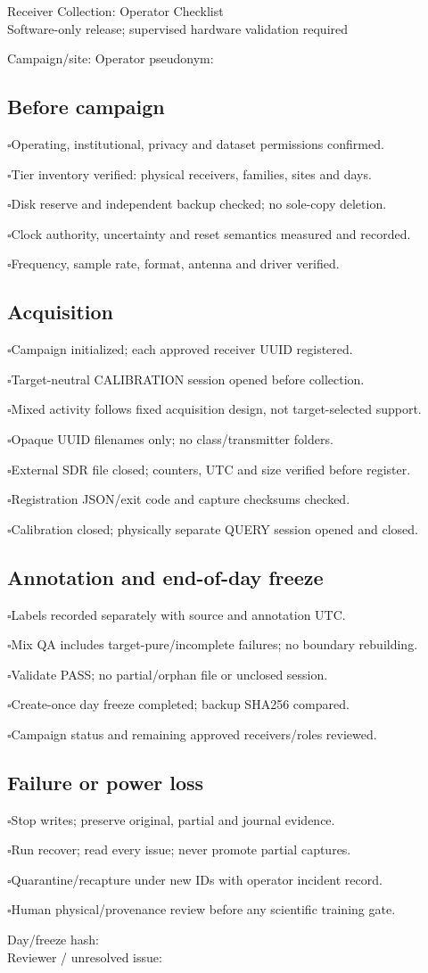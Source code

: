 \documentclass[10pt]{article}
\newcommand{\checkitem}[1]{\noindent$\square$\quad #1\par\smallskip}
\begin{document}
\begin{center}\Large Receiver Collection: Operator Checklist\\
\normalsize Software-only release; supervised hardware validation required\end{center}
\noindent Campaign/site: \hrulefill\quad Operator pseudonym: \hrulefill

\subsection*{Before campaign}
\checkitem{Operating, institutional, privacy and dataset permissions confirmed.}
\checkitem{Tier inventory verified: physical receivers, families, sites and days.}
\checkitem{Disk reserve and independent backup checked; no sole-copy deletion.}
\checkitem{Clock authority, uncertainty and reset semantics measured and recorded.}
\checkitem{Frequency, sample rate, format, antenna and driver verified.}

\subsection*{Acquisition}
\checkitem{Campaign initialized; each approved receiver UUID registered.}
\checkitem{Target-neutral CALIBRATION session opened before collection.}
\checkitem{Mixed activity follows fixed acquisition design, not target-selected support.}
\checkitem{Opaque UUID filenames only; no class/transmitter folders.}
\checkitem{External SDR file closed; counters, UTC and size verified before register.}
\checkitem{Registration JSON/exit code and capture checksums checked.}
\checkitem{Calibration closed; physically separate QUERY session opened and closed.}

\subsection*{Annotation and end-of-day freeze}
\checkitem{Labels recorded separately with source and annotation UTC.}
\checkitem{Mix QA includes target-pure/incomplete failures; no boundary rebuilding.}
\checkitem{Validate PASS; no partial/orphan file or unclosed session.}
\checkitem{Create-once day freeze completed; backup SHA256 compared.}
\checkitem{Campaign status and remaining approved receivers/roles reviewed.}

\subsection*{Failure or power loss}
\checkitem{Stop writes; preserve original, partial and journal evidence.}
\checkitem{Run recover; read every issue; never promote partial captures.}
\checkitem{Quarantine/recapture under new IDs with operator incident record.}
\checkitem{Human physical/provenance review before any scientific training gate.}

\noindent Day/freeze hash: \hrulefill\\[8pt]
Reviewer / unresolved issue: \hrulefill
\end{document}
